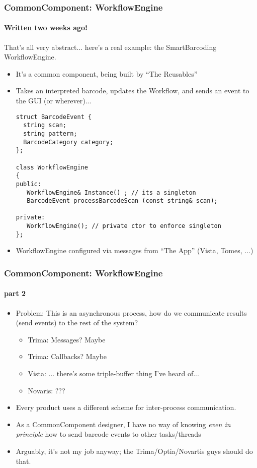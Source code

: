 \begin{frame}[fragile,t]
\frametitle{CommonComponent: WorkflowEngine}
\framesubtitle{Written two weeks ago!}
\begin{center}That's all very abstract... here's a real example: the
  SmartBarcoding WorkflowEngine.\end{center}
\begin{itemize}[<+->]
\item It's a common component, being built by ``The Reusables''
\item Takes an interpreted barcode, updates the Workflow, and sends an
  event to the GUI (or wherever)...
{\scriptsize
\begin{verbatim}
struct BarcodeEvent { 
  string scan; 
  string pattern; 
  BarcodeCategory category;
};

class WorkflowEngine
{
public:
   WorkflowEngine& Instance() ; // its a singleton
   BarcodeEvent processBarcodeScan (const string& scan);

private:
   WorkflowEngine(); // private ctor to enforce singleton
};
\end{verbatim}
}
\item WorkflowEngine configured via messages from ``The App''
  (Vista, Tomes, ...)
\end{itemize}
\end{frame}

\begin{frame}[fragile,t]
\frametitle{CommonComponent: WorkflowEngine}
\framesubtitle{part 2}
\begin{itemize}[<+->]
\item Problem: This is an asynchronous process, how do we communicate
  results (send events) to the rest of the system?
\begin{itemize}
  \item Trima: Messages?  Maybe
  \item Trima: Callbacks?  Maybe
  \item Vista: ... there's some triple-buffer thing I've heard of...
  \item Novaris:  ???
\end{itemize}
\item Every product uses a different scheme for inter-process communication.
\item As a CommonComponent designer, I have no way of knowing
  \emph{even in principle} how to send barcode events to other tasks/threads
\item Arguably, it's not my job anyway; the Trima/Optia/Novartis guys
  should do that.
\end{itemize}
\end{frame}

